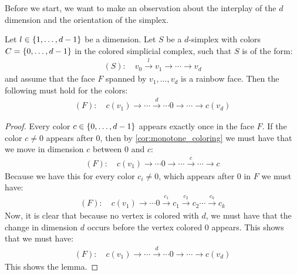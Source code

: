 Before we start, we want to make an observation about the interplay of the $d$ dimension and the orientation of the simplex.
\begin{lemma}
	\label{lem:position_of_d_in_simplex}
	Let $l \in \left\{1, \dots, d-1\right\}$ be a dimension. Let $S$ be a $d$-simplex with colors $C = \left\{0, \dots, d-1\right\}$ in the colored simplicial complex, such that $S$ is of the form:
	\begin{align*}
		(S): \quad v_0 \xrightarrow{l} v_1 \xrightarrow{} \cdots \xrightarrow{} v_d
	\end{align*}
	and assume that the face $F$ spanned by $v_1, \dots, v_d$ is a rainbow face. Then the following must hold for the colors:
	\begin{align*}
		(F): \quad c(v_1) \xrightarrow{}  \cdots \xrightarrow{d} \cdots  0 \xrightarrow{} \cdots \xrightarrow{} c(v_d)
	\end{align*}
\end{lemma}
\begin{proof}
	Every color $c \in \left\{0, \dots, d-1\right\}$ appears exactly once in the face $F$. If the color $c \neq 0$ appears after $0$, then by \cref{cor:monotone_coloring} we must have that we move in dimension $c$ between $0$ and $c$:
	\begin{align*}
		(F): \quad c(v_1) \xrightarrow{} \cdots  0 \xrightarrow{} \cdots \xrightarrow{c} \cdots \xrightarrow{} c
	\end{align*}
	Because we have this for every color $c_i \neq 0$, which appears after $0$ in $F$ we must have:
	\begin{align*}
		(F): \quad c(v_1) \xrightarrow{} \cdots  0 \xrightarrow{c_1} c_1 \xrightarrow{c_2} c_2 \cdots \xrightarrow{c_k} c_k
	\end{align*}
	Now, it is clear that because no vertex is colored with $d$, we must have that the change in dimension $d$ occurs before the vertex colored $0$ appears. This shows that we must have:
	\begin{align*}
		(F): \quad c(v_1) \xrightarrow{}  \cdots \xrightarrow{d} \cdots  0 \xrightarrow{} \cdots \xrightarrow{} c(v_d)
	\end{align*}
	This shows the lemma.
\end{proof}

